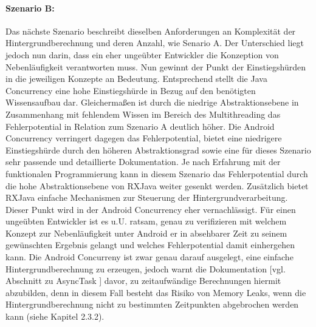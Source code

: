 \documentclass[12pt,oneside,a4paper,bibtotoc,liststotoc]{scrreprt}
\begin{document}
\paragraph{Szenario B:}
Das nächste Szenario beschreibt dieselben Anforderungen an Komplexität der Hintergrundberechnung und deren Anzahl, wie Senario A. Der Unterschied liegt jedoch nun darin, dass ein eher ungeübter Entwickler die Konzeption von Nebenläufigkeit verantworten muss. Nun gewinnt der Punkt der Einstiegshürden in die jeweiligen Konzepte an Bedeutung. Entsprechend stellt die Java Concurrency eine hohe Einstiegshürde in Bezug auf den benötigten Wissensaufbau dar. Gleichermaßen ist durch die niedrige Abstraktionsebene in Zusammenhang mit fehlendem Wissen im Bereich des Multithreading das Fehlerpotential in Relation zum Szenario A deutlich höher.
Die Android Concurrency verringert dagegen das Fehlerpotential, bietet eine niedrigere Einstiegshürde durch den höheren Abstraktionsgrad sowie eine für dieses Szenario sehr passende und detaillierte Dokumentation.
Je nach Erfahrung mit der funktionalen Programmierung kann in diesem Szenario das Fehlerpotential durch die hohe Abstraktionsebene von RXJava weiter gesenkt werden. Zusätzlich bietet RXJava einfache Mechanismen zur Steuerung der Hintergrundverarbeitung. Dieser Punkt wird in der Android Concurrency eher vernachlässigt.
Für einen ungeübten Entwickler ist es u.U. ratsam, genau zu verifizieren mit welchem Konzept zur Nebenläufigkeit unter Android er in absehbarer Zeit zu seinem gewünschten Ergebnis gelangt und welches Fehlerpotential damit einhergehen kann. Die Android Concurreny ist zwar genau darauf ausgelegt, eine einfache Hintergrundberechnung zu erzeugen, jedoch warnt die Dokumentation [vgl. Abschnitt zu AsyncTask \citet{androidDevDocu}] davor, zu zeitaufwändige Berechnungen hiermit abzubilden, denn in diesem Fall besteht das Risiko von Memory Leaks, wenn die Hintergrundberechnung nicht zu bestimmten Zeitpunkten abgebrochen werden kann (siehe Kapitel 2.3.2).
\end{document}
